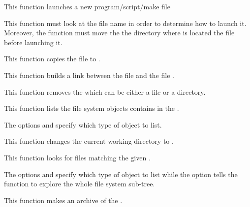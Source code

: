          {
	   This function launches a new program/script/make file \etc{}

	   \-

	   This function must look at the file name in order to determine
	   how to launch it. Moreover, the function must move the the
	   directory where is located the file before launching it.
	 }

         {
	   This function copies the file  to
	   .
	 }

         {
	   This function builds a link between the file 
	   and the file .
	 }

         {
	   This function removes the  which can be either
	   a file or a directory.
	 }

         {
	   This function lists the file system objects contains in the
	   .

	   \-

	   The options  and 
	   specify which type of object to list.
	 }

         {
	   This function changes the current working directory to
	   .
	 }

         {
	   This function looks for files matching the given .

	   \-

	   The options  and 
	   specify which type of object to list while the
	    option tells the function to explore
	   the whole file system sub-tree.
	 }

         {
	   This function makes an archive  of the
	   .
	 }

